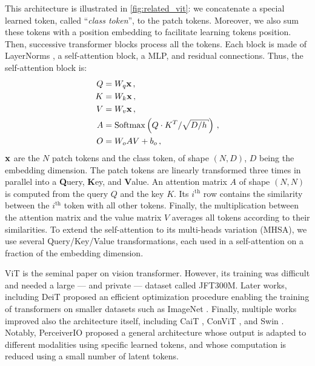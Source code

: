 This architecture is illustrated in \autoref{fig:related_vit}: we concatenate a special learned
token, called ``\textit{class token}'', to the patch tokens. Moreover, we also sum these tokens with
a position embedding to facilitate learning tokens position. Then, successive
transformer blocks process all the tokens. Each block is made of LayerNorms \citep{ba2016layernorm},
a self-attention block, a \ac{MLP}, and residual connections. Thus, the self-attention block is:
%
\begin{equation}
      \begin{aligned}
            Q & =W_{q} \vx\,,                                                       \\
            K & =W_{k} \vx\,,                                                       \\
            V & =W_{v} \vx\,,                                                       \\
            A & =\operatorname{Softmax}\left(Q \cdot K^{T} / \sqrt{D / h}\right)\,, \\
            O & = W_{o} A V+b_{o}\,,
      \end{aligned}
      \label{sec:related_sa}
\end{equation}
%
\noindent $\mathbf{x}$ are the $N$ patch tokens and the class token, of shape $(N, D)$, $D$ being the
embedding dimension. The patch tokens are linearly transformed three times in parallel into a
\textbf{Q}uery, \textbf{K}ey, and \textbf{V}alue. An attention matrix $A$ of shape $(N, N)$ is
computed from the query $Q$ and the key $K$. Its $i^{\text{th}}$ row contains the similarity between
the $i^{\text{th}}$ token with all other tokens. Finally, the multiplication between the attention
matrix and the value matrix $V$ averages all tokens according to their similarities. To extend the
self-attention to its multi-heads variation (\ac{MHSA}), we use several Query/Key/Value
transformations, each used in a self-attention on a fraction of the embedding dimension.

ViT \citep{dosovitskiy2020vit} is the seminal paper on vision transformer. However, its training was
difficult and needed a large --- and private --- dataset called JFT300M. Later works, including DeiT
\citep{touvron2021deit} proposed an efficient optimization procedure enabling the training of
transformers on smaller datasets such as ImageNet \citep{russakovsky2015imagenet_ilsvrc}. Finally,
multiple works improved also the architecture itself, including CaiT \citep{touvron2021cait}, ConViT
\citep{dascoli2021convit}, and Swin \citep{liu2021swin}. Notably, PerceiverIO
\citep{jaegle2021perceiverio} proposed a general architecture whose output is adapted to different
modalities using specific learned tokens, and whose computation is reduced using a small number of
latent tokens.


